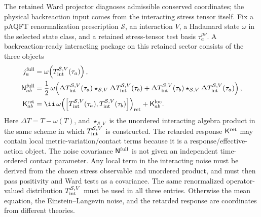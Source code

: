 \begin{controlledapproximation}
\label{ca:semiclassical-interacting-stress-noise-package}
The retained Ward projector diagnoses admissible conserved coordinates; the
physical backreaction input comes from the interacting stress tensor itself.
Fix a pAQFT renormalization prescription \(\mathcal S\), an interaction \(V\),
a Hadamard state \(\omega\) in the selected state class, and a retained
stress-tensor test basis \(\tau_a^{\mu\nu}\).  A backreaction-ready interacting
package on this retained sector consists of the three objects
\begin{equation}
\begin{aligned}
  j_a^{\rm full}
  &=
  \omega\!\left(T_{\rm int}^{\mathcal S,V}(\tau_a)\right),\\
  \mathsf N_{ab}^{\rm full}
  &=
  \frac12\,
  \omega\!\left(
    \Delta T_{\rm int}^{\mathcal S,V}(\tau_a)
    \star_{\mathcal S,V}
    \Delta T_{\rm int}^{\mathcal S,V}(\tau_b)
    +
    \Delta T_{\rm int}^{\mathcal S,V}(\tau_b)
    \star_{\mathcal S,V}
    \Delta T_{\rm int}^{\mathcal S,V}(\tau_a)
  \right),\\
  \mathsf K_{ab}^{\rm ret}
  &=
  \ii\,\omega\!\left(
    \left[
      T_{\rm int}^{\mathcal S,V}(\tau_a),
      T_{\rm int}^{\mathcal S,V}(\tau_b)
    \right]
  \right)_{\rm ret}
  +\mathsf K_{ab}^{\rm loc}.
\end{aligned}
  \label{eq:semiclassical-full-interacting-package}
\end{equation}
Here \(\Delta T=T-\omega(T)\), and
\(\star_{\mathcal S,V}\) is the unordered interacting algebra product in the
same scheme in which \(T_{\rm int}^{\mathcal S,V}\) is constructed.  The
retarded response \(\mathsf K^{\rm ret}\) may contain local
metric-variation/contact terms because it is a response/effective-action
object.  The noise covariance \(\mathsf N^{\rm full}\) is not given an
independent time-ordered contact parameter.  Any local term in the interacting
noise must be derived from the chosen stress observable and unordered product,
and must then pass positivity and Ward tests as a covariance.  The same
renormalized operator-valued distribution \(T_{\rm int}^{\mathcal S,V}\) must
be used in all three entries.  Otherwise the mean equation, the
Einstein--Langevin noise, and the retarded response are coordinates from
different theories.


\end{controlledapproximation}
